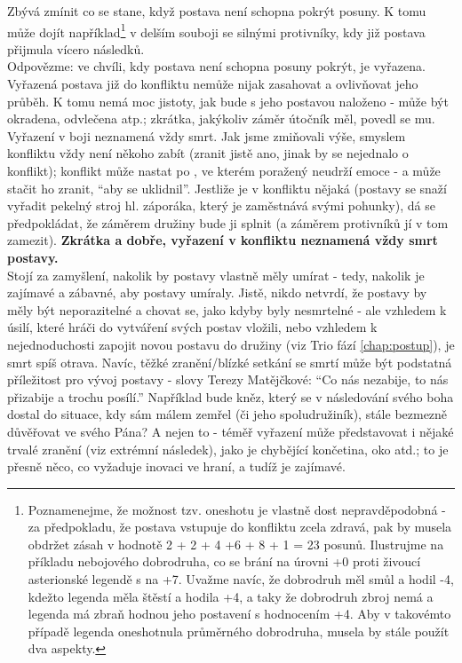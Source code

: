 \documentclass[../main.tex]{subfiles}
\begin{document}
Zbývá zmínit co se stane, když postava není schopna pokrýt posuny. K tomu může dojít například\footnote{Poznamenejme, že možnost tzv. oneshotu je vlastně dost nepravděpodobná - za předpokladu, že postava vstupuje do konfliktu zcela zdravá, pak by musela obdržet zásah v hodnotě 2 + 2 + 4 +6 + 8 + 1 = 23 posunů. Ilustrujme na příkladu nebojového dobrodruha, co se brání  na úrovni +0 proti živoucí asterionské legendě s  na +7. Uvažme navíc, že dobrodruh měl smůl a hodil -4, kdežto legenda měla štěstí a hodila +4, a taky že dobrodruh zbroj nemá a legenda má zbraň hodnou jeho postavení s hodnocením +4. Aby v takovémto případě legenda oneshotnula průměrného dobrodruha, musela by stále použít dva aspekty. } v delším souboji se silnými protivníky, kdy již postava přijmula vícero následků.\\ 
Odpovězme: ve chvíli, kdy postava není schopna posuny pokrýt, je vyřazena. Vyřazená postava již do konfliktu nemůže nijak zasahovat a ovlivňovat jeho průběh. K tomu nemá moc jistoty, jak bude s jeho postavou naloženo - může být okradena, odvlečena atp.; zkrátka, jakýkoliv záměr útočník měl, povedl se mu. \\
Vyřazení v boji neznamená vždy smrt. Jak jsme zmiňovali výše, smyslem konfliktu vždy není někoho zabít (zranit jistě ano, jinak by se nejednalo o konflikt); konflikt může nastat po , ve kterém poražený neudrží emoce - a může stačit ho zranit, ``aby se uklidnil''. Jestliže je v konfliktu nějaká  (postavy se snaží vyřadit pekelný stroj hl. záporáka, který je zaměstnává svými pohunky), dá se předpokládat, že záměrem družiny bude ji splnit (a záměrem protivníků jí v tom zamezit). \textbf{Zkrátka a dobře, vyřazení v konfliktu neznamená vždy smrt postavy.}\\
Stojí za zamyšlení, nakolik by postavy vlastně měly umírat - tedy, nakolik je zajímavé a zábavné, aby postavy umíraly. Jistě, nikdo netvrdí, že postavy by měly být neporazitelné a chovat se, jako kdyby byly nesmrtelné - ale vzhledem k úsilí, které hráči do vytváření svých postav vložili, nebo vzhledem k nejednoduchosti zapojit novou postavu do družiny (viz Trio fází \ref{chap:postup}), je smrt spíš otrava. Navíc, těžké zranění/blízké setkání se smrtí může být podstatná příležitost pro vývoj postavy - slovy Terezy Matějčkové: ``Co nás nezabije, to nás přizabije a trochu posílí.'' Například bude kněz, který se v následování svého boha dostal do situace, kdy sám málem zemřel (či jeho spoludružiník), stále bezmezně důvěřovat ve svého Pána? A nejen to - téměř vyřazení může představovat i nějaké trvalé zranění (viz extrémní následek), jako je chybějící končetina, oko atd.; to je přesně něco, co vyžaduje inovaci ve hraní, a tudíž je zajímavé.
\end{document}
